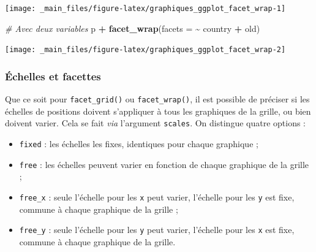 \documentclass[
  11pt,
]{book}
\newenvironment{Shaded}{\begin{snugshade}}{\end{snugshade}}
\newcommand{\CommentTok}[1]{\textcolor[rgb]{0.56,0.35,0.01}{\textit{#1}}}
\newcommand{\DataTypeTok}[1]{\textcolor[rgb]{0.13,0.29,0.53}{#1}}
\newcommand{\KeywordTok}[1]{\textcolor[rgb]{0.13,0.29,0.53}{\textbf{#1}}}
\newcommand{\NormalTok}[1]{#1}
\newcommand{\OperatorTok}[1]{\textcolor[rgb]{0.81,0.36,0.00}{\textbf{#1}}}
\newcommand{\StringTok}[1]{\textcolor[rgb]{0.31,0.60,0.02}{#1}}
\providecommand{\tightlist}{%
  \setlength{\itemsep}{0pt}\setlength{\parskip}{0pt}}
\numberwithin{equation}{section}
\numberwithin{countremarque}{section}
\begin{document}
\begin{center}\texttt{[image: \_main\_files/figure-latex/graphiques\_ggplot\_facet\_wrap-1]} \end{center}

\begin{Shaded}
\begin{Highlighting}[]
\CommentTok{\# Avec deux variables}
\NormalTok{p }\OperatorTok{+}\StringTok{ }\KeywordTok{facet\_wrap}\NormalTok{(}\DataTypeTok{facets =} \OperatorTok{\textasciitilde{}}\StringTok{ }\NormalTok{country }\OperatorTok{+}\StringTok{ }\NormalTok{old)}
\end{Highlighting}
\end{Shaded}

\begin{center}\texttt{[image: \_main\_files/figure-latex/graphiques\_ggplot\_facet\_wrap-2]} \end{center}

\hypertarget{graphiques_ggplot_facet_scales}{%
\subsubsection{Échelles et facettes}\label{graphiques_ggplot_facet_scales}}

Que ce soit pour \texttt{facet\_grid()} ou \texttt{facet\_wrap()}, il est possible de préciser si les échelles de positions doivent s'appliquer à tous les graphiques de la grille, ou bien doivent varier. Cela se fait \emph{via} l'argument \texttt{scales}. On distingue quatre options :

\begin{itemize}
\tightlist
\item
  \texttt{fixed} : les échelles les fixes, identiques pour chaque graphique ;
\item
  \texttt{free} : les échelles peuvent varier en fonction de chaque graphique de la grille ;
\item
  \texttt{free\_x} : seule l'échelle pour les \texttt{x} peut varier, l'échelle pour les \texttt{y} est fixe, commune à chaque graphique de la grille ;
\item
  \texttt{free\_y} : seule l'échelle pour les \texttt{y} peut varier, l'échelle pour les \texttt{x} est fixe, commune à chaque graphique de la grille.
\end{itemize}
\end{document}
